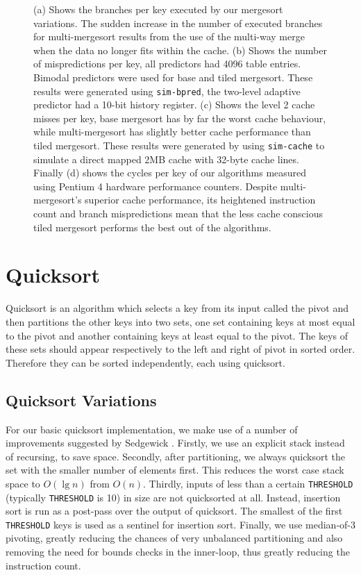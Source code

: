 \documentclass[acmtocl]{acmtrans2m}
\begin{document}
\begin{figure}
\caption{(a) Shows the branches per key executed by our mergesort variations.
The sudden increase in the number of executed branches for multi-mergesort
results from the use of the multi-way merge when the data no longer fits within
the cache. (b) Shows the number of mispredictions per key, all predictors had
4096 table entries. Bimodal predictors were used for base and tiled mergesort.
These results were generated using \texttt{sim-bpred}, the two-level adaptive
predictor had a 10-bit history register.  (c) Shows the level 2 cache misses per
key, base mergesort has by far the worst cache behaviour, while multi-mergesort
has slightly better cache performance than tiled mergesort. These results were
generated by using \texttt{sim-cache} to simulate a direct mapped 2MB cache with
32-byte cache lines. Finally (d) shows the cycles per key of our algorithms
measured using Pentium 4 hardware performance counters. Despite
multi-mergesort's superior cache performance, its heightened instruction count
and branch mispredictions mean that the less cache conscious tiled mergesort
performs the best out of the algorithms.}
\label{mergesort_branch_results}
\end{figure}

\section{Quicksort}

Quicksort \cite{Hoare62} is an algorithm which selects a key from its input
called the pivot and then partitions the other keys into two sets, one set
containing keys at most equal to the pivot and another containing keys at least
equal to the pivot. The keys of these sets should appear respectively to the
left and right of pivot in sorted order.  Therefore they can be sorted
independently, each using quicksort.

\subsection{Quicksort Variations}

For our basic quicksort implementation, we make use of a number of improvements
suggested by Sedgewick \citeyear{Sedgewick78}. Firstly, we use an explicit stack
instead of recursing, to save space. Secondly, after partitioning, we always
quicksort the set with the smaller number of elements first.  This reduces the
worst case stack space to $O(\lg n)$ from $O(n)$.  Thirdly, inputs of less than
a certain \texttt{THRESHOLD} (typically \texttt{THRESHOLD} is 10) in size are
not quicksorted at all. Instead, insertion sort is run as a post-pass over the
output of quicksort.  The smallest of the first \texttt{THRESHOLD} keys is used
as a sentinel for insertion sort.  Finally, we use median-of-3 pivoting, greatly
reducing the chances of very unbalanced partitioning and also removing the need
for bounds checks in the inner-loop, thus greatly reducing the instruction
count.
\end{document}
